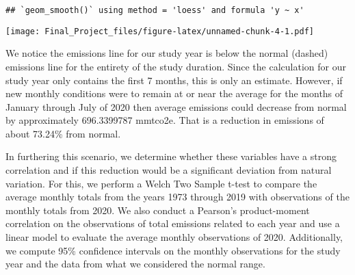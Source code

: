 \documentclass[
]{article}
\begin{document}
\begin{verbatim}
## `geom_smooth()` using method = 'loess' and formula 'y ~ x'
\end{verbatim}

\texttt{[image: Final\_Project\_files/figure-latex/unnamed-chunk-4-1.pdf]}

We notice the emissions line for our study year is below the normal
(dashed) emissions line for the entirety of the study duration. Since
the calculation for our study year only contains the first 7 months,
this is only an estimate. However, if new monthly conditions were to
remain at or near the average for the months of January through July of
2020 then average emissions could decrease from normal by approximately
696.3399787 mmtco2e. That is a reduction in emissions of about 73.24\%
from normal.

In furthering this scenario, we determine whether these variables have a
strong correlation and if this reduction would be a significant
deviation from natural variation. For this, we perform a Welch Two
Sample t-test to compare the average monthly totals from the years 1973
through 2019 with observations of the monthly totals from 2020. We also
conduct a Pearson's product-moment correlation on the observations of
total emissions related to each year and use a linear model to evaluate
the average monthly observations of 2020. Additionally, we compute 95\%
confidence intervals on the monthly observations for the study year and
the data from what we considered the normal range.
\end{document}
